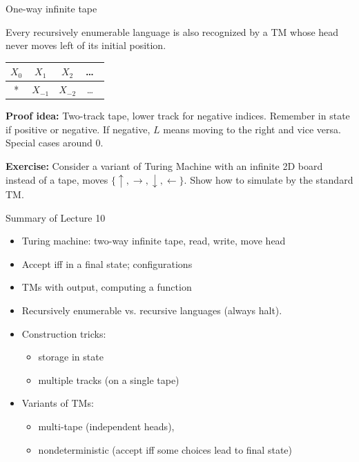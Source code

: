 \documentclass[handout]{beamer}
\begin{document}
\begin{frame}{One-way infinite tape}

    \begin{theorem}
        Every recursively enumerable language is also recognized by a TM whose head never moves left of its initial position.
    \end{theorem}
        
    \medskip
    \begin{center}
        \begin{tabular}{|c|c|c|c}
        \hline
        $X_0$ &$X_1$ &$X_2$ & \ldots\hspace{5cm}\  \\ \hline
        * &$X_{-1}$ &$X_{-2}$ & \ldots \hspace{5cm}\ \\
        \hline
        \end{tabular}
    \end{center}
    \textbf{Proof idea:} Two-track tape, lower track for negative indices. Remember in state if positive or negative. If negative, $L$ means moving to the right and vice versa. Special cases around 0.\hfill\qedsymbol

    \bigskip

    \textbf{Exercise:} Consider a variant of Turing Machine with an infinite 2D board instead of a tape, moves $\{\uparrow,\rightarrow,\downarrow,\leftarrow\}$. Show how to simulate by the standard TM.
    
\end{frame}


\begin{frame}{Summary of Lecture 10}

    \begin{itemize}        
        \item Turing machine: two-way infinite tape, read, write, move head
        \item Accept iff in a final state; configurations
        \item TMs with output, computing a function
        \item Recursively enumerable vs. recursive languages (always halt).
        \item Construction tricks: 
        \begin{itemize}
            \item storage in state
            \item multiple tracks (on a single tape)
        \end{itemize}
        \item Variants of TMs: 
        \begin{itemize}
            \item multi-tape (independent heads),
            \item nondeterministic (accept iff some choices lead to final state)
        \end{itemize}  
    \end{itemize}
    
\end{frame}
\end{document}
